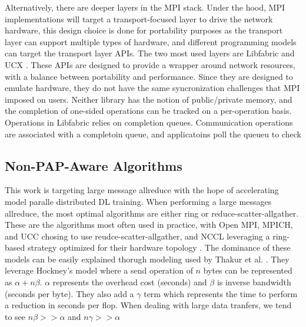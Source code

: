 Alternatively, there are deeper layers in the MPI stack. 
Under the hood, MPI implementations will target a transport-focused layer to drive the network hardware, this design choice is done for portability purposes as the transport layer can support multiple types of hardware, and different programming models can target the transport layer APIs.
The two most used layers are Libfabric and UCX \cite{libfabric, shamis2015ucx}.
These APIs are designed to provide a wrapper around network resources, with a balance between portability and performance.
Since they are designed to emulate hardware, they do not have the same syncronization challenges that MPI imposed on users.  
Neither library has the notion of public/private memory, and the completion of one-sided operations can be tracked on a per-operation basis. 
Operations in Libfabric relies on completion queues.
Communication operations are associated with a completoin queue, and applicatoins poll the queueu to check 

\subsection{Non-PAP-Aware Algorithms}

This work is targeting large message allreduce with the hope of accelerating model paralle distributed DL training.
When performing a large messages allreduce, the most optimal algorithms are either ring or reduce-scatter-allgather.
These are the algorithms most often used in practice, with Open MPI, MPICH, and UCC chosing to use reudce-scatter-allgather, and NCCL leveraging a ring-based strategy optimized for their hardware topology \cite{gabriel2004OpenMPI, MPICH, UCC, NCCL}.
The dominance of these models can be easily explained thorugh modeling used by Thakur et al. \cite{Thakur2005OptMPICH}.
They leverage Hockney's model \cite{Hockney1994HockenyModel} where a send operation of $n$ bytes can be represented as $\alpha+n\beta$.
$\alpha$ represents the overhead cost (seconds) and $\beta$ is inverse bandwidth (seconds per byte).
They also add a $\gamma$ term which represents the time to perform a reduction in seconds per flop. 
When dealing with large data tranfers, we tend to see $n\beta>>\alpha$ and $n\gamma>>\alpha$ 

